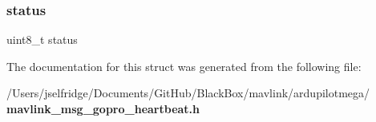 \mbox{\label{struct____mavlink__gopro__heartbeat__t_ade818037fd6c985038ff29656089758d}} 
\subsubsection{status}
{\footnotesize\ttfamily uint8\+\_\+t status}



The documentation for this struct was generated from the following file\+:\begin{DoxyCompactItemize}
\item 
/\+Users/jselfridge/\+Documents/\+Git\+Hub/\+Black\+Box/mavlink/ardupilotmega/\textbf{ mavlink\+\_\+msg\+\_\+gopro\+\_\+heartbeat.\+h}\end{DoxyCompactItemize}
